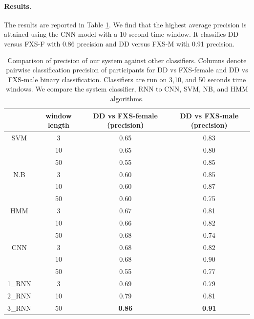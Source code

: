\documentclass{llncs}
\begin{document}
  \vspace*{-\baselineskip}
  \paragraph{Results.} The results are reported in Table  \ref{table:profiler}. We find that the highest average precision is attained using the CNN model with a 10 second time window. It classifies DD versus FXS-F with 0.86 precision and DD versus FXS-M with 0.91 precision.

  \begin{table}[t]
    \centering
    \begin{tabular}{c|c|c|c}
      & window length & DD vs FXS-female (precision) & DD vs FXS-male (precision)\\
      \hline
      SVM  & 3   & 0.65 & 0.83\\
      & 10 & 0.65 & 0.80 \\
      & 50 & 0.55 & 0.85 \\

      \hline
      N.B   & 3  & 0.60 & 0.85\\
      & 10 & 0.60 & 0.87\\
      & 50 & 0.60 & 0.75\\

      \hline
      HMM & 3  & 0.67 & 0.81\\
      & 10 & 0.66 & 0.82\\
      & 50 & 0.68 & 0.74\\

      \hline
      CNN & 3 & 0.68 & 0.82 \\
      & 10 & 0.68 & 0.90\\
      & 50 & 0.55 & 0.77\\
      \hline
      1\_RNN  & 3 &  0.69 & 0.79 \\
      2\_RNN  & 10 &   0.79 &  0.81\\
      3\_RNN  &  50 & {\bf 0.86} & {\bf 0.91}\\

    \end{tabular}
    \caption{Comparison of precision of our system against other classifiers. Columns denote pairwise classification precision of participants for DD vs FXS-female and DD vs FXS-male binary classification. Classifiers are run on 3,10, and 50 seconds time windows. We compare the system classifier, RNN to CNN, SVM, NB, and HMM algorithms.}
    \label{table:profiler}
  \end{table}
\end{document}
